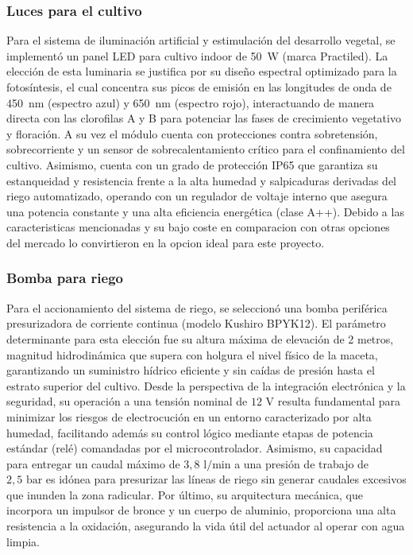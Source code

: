 \subsubsection{Luces para el cultivo}
Para el sistema de iluminación artificial y estimulación del desarrollo vegetal, se implementó un panel LED para cultivo indoor de 50~W (marca Practiled). La elección de esta luminaria se justifica por su diseño espectral optimizado para la fotosíntesis, el cual concentra sus picos de emisión en las longitudes de onda de 450~nm (espectro azul) y 650~nm (espectro rojo), interactuando de manera directa con las clorofilas A y B para potenciar las fases de crecimiento vegetativo y floración. A su vez el módulo cuenta con protecciones contra sobretensión, sobrecorriente y un sensor de sobrecalentamiento crítico para el confinamiento del cultivo. Asimismo, cuenta con un grado de protección IP65 que garantiza su estanqueidad y resistencia frente a la alta humedad y salpicaduras derivadas del riego automatizado, operando con un regulador de voltaje interno que asegura una potencia constante y una alta eficiencia energética (clase A++). Debido a las caracteristicas mencionadas y su bajo coste en comparacion con otras opciones del mercado lo convirtieron en la opcion ideal para este proyecto.

\subsubsection{Bomba para riego}
Para el accionamiento del sistema de riego, se seleccionó una bomba periférica presurizadora de corriente continua (modelo Kushiro BPYK12). El parámetro determinante para esta elección fue su altura máxima de elevación de 2 metros, magnitud hidrodinámica que supera con holgura el nivel físico de la maceta, garantizando un suministro hídrico eficiente y sin caídas de presión hasta el estrato superior del cultivo. Desde la perspectiva de la integración electrónica y la seguridad, su operación a una tensión nominal de $12\text{ V}$ resulta fundamental para minimizar los riesgos de electrocución en un entorno caracterizado por alta humedad, facilitando además su control lógico mediante etapas de potencia estándar (relé) comandadas por el microcontrolador. Asimismo, su capacidad para entregar un caudal máximo de $3{,}8\text{ l/min}$ a una presión de trabajo de $2{,}5\text{ bar}$ es idónea para presurizar las líneas de riego sin generar caudales excesivos que inunden la zona radicular. Por último, su arquitectura mecánica, que incorpora un impulsor de bronce y un cuerpo de aluminio, proporciona una alta resistencia a la oxidación, asegurando la vida útil del actuador al operar con agua limpia.

